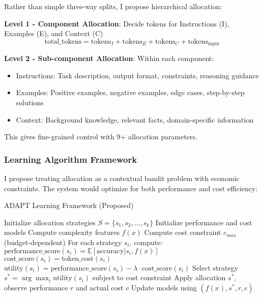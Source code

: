 \documentclass[11pt,a4paper]{article}
\begin{document}
Rather than simple three-way splits, I propose hierarchical allocation:

\textbf{Level 1 - Component Allocation}: Decide tokens for Instructions (I), Examples (E), and Context (C)
\begin{equation}
\text{total\_tokens} = \text{tokens}_I + \text{tokens}_E + \text{tokens}_C + \text{tokens}_{\text{input}}
\end{equation}

\textbf{Level 2 - Sub-component Allocation}: Within each component:
\begin{itemize}
\item Instructions: Task description, output format, constraints, reasoning guidance
\item Examples: Positive examples, negative examples, edge cases, step-by-step solutions
\item Context: Background knowledge, relevant facts, domain-specific information
\end{itemize}

This gives fine-grained control with 9+ allocation parameters.

\subsubsection{Learning Algorithm Framework}

I propose treating allocation as a contextual bandit problem with economic constraints. The system would optimize for both performance and cost efficiency:

\begin{algorithm}[h]
\caption{ADAPT Learning Framework (Proposed)}
\begin{algorithmic}[1]
\STATE Initialize allocation strategies $S = \{s_1, s_2, ..., s_k\}$
\STATE Initialize performance and cost models
    \STATE Compute complexity features $f(x)$
    \STATE Compute cost constraint $c_{max}$ (budget-dependent)
    \STATE For each strategy $s_i$, compute:
    \STATE \quad $\text{performance\_score}(s_i) = \mathbb{E}[\text{accuracy}|s_i, f(x)]$
    \STATE \quad $\text{cost\_score}(s_i) = \text{token\_cost}(s_i)$
    \STATE \quad $\text{utility}(s_i) = \text{performance\_score}(s_i) - \lambda \cdot \text{cost\_score}(s_i)$
    \STATE Select strategy $s^* = \arg\max_i \text{utility}(s_i)$ subject to cost constraint
    \STATE Apply allocation $s^*$, observe performance $r$ and actual cost $c$
    \STATE Update models using $(f(x), s^*, r, c)$
\ENDFOR
\end{algorithmic}
\end{algorithm}
\end{document}

